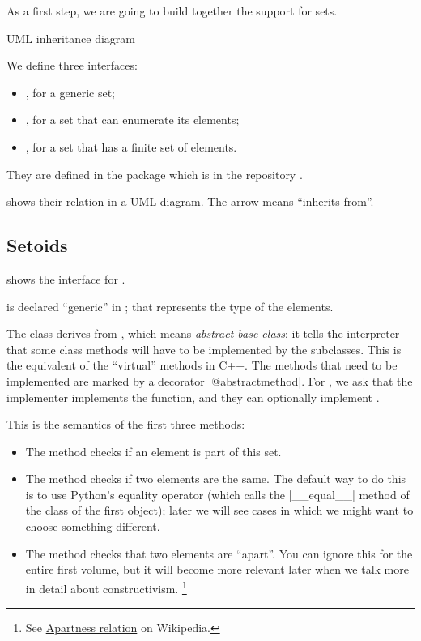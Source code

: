
As a first step, we are going to build together the support for sets.

\begin{marginfigure}

    \caption{UML inheritance diagram}
    \label{fig:Setoid-inheritance}
\end{marginfigure}

We define three interfaces:
\begin{itemize}
    \item \Setoid, for a generic set;
    \item \EnumerableSet, for a set that can enumerate its elements;
    \item \FiniteSet, for a set that has a finite set of elements.
\end{itemize}

They are defined in the package  which is in the repository .

 shows their relation in a UML diagram.
The arrow means ``inherits from''.

\subsection*{Setoids}

 shows the interface for \Setoid.


\Setoid is declared ``generic'' in ; that represents the type of the elements.

The class \Setoid derives from \ABC, which means \emph{abstract base class}; it tells the interpreter that some class methods will have to be implemented by the subclasses.
This is the equivalent of the ``virtual'' methods in C++.
The methods that need to be implemented are marked by a decorator \pystr|@abstractmethod|.
For \Setoid, we ask that the implementer implements the  function, and they can optionally implement .

This is the semantics of the first three methods:

\begin{itemize}
    \item The method  checks if an element is part of this set.
    \item The method  checks if two elements are the same.
          The default way to do this is to use Python's equality operator (which calls the \pystr|__equal__| method of the class of the first object); later we will see cases in which we might want to choose something different.
    \item The method  checks that two elements are ``apart''.
          You can ignore this for the entire first volume, but it will become more relevant later when we talk more in detail about constructivism.
          \footnote{%
              See \href{https://en.wikipedia.org/wiki/Apartness_relation}{Apartness relation} on Wikipedia.
          }
\end{itemize}

